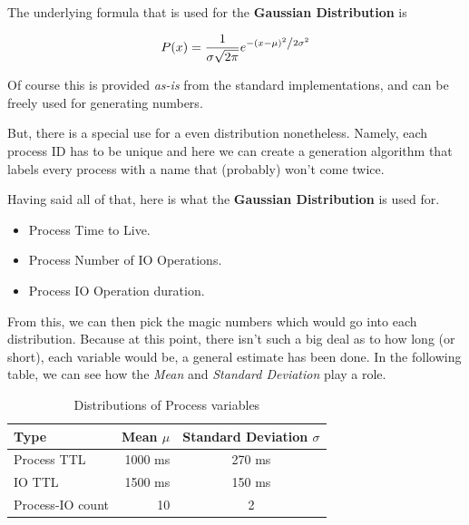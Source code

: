 \documentclass{article}
\newcommand{\code}[1]{\codeinline{\texttt{#1}}}
\begin{document}
The underlying formula that is used for the \textbf{Gaussian Distribution} is

\begin{equation}
P(x) = \frac{1}{{\sigma \sqrt {2\pi } }}e^{{{ - \left( {x - \mu } \right)^2 } \mathord{\left/ {\vphantom {{ - \left( {x - \mu } \right)^2 } {2\sigma ^2 }}} \right. \kern-\nulldelimiterspace} {2\sigma ^2 }}}
\end{equation}

Of course this is provided \textit{as-is} from the standard \code{C++} implementations, and can be freely used for generating numbers.

But, there is a special use for a even distribution nonetheless. Namely, each process ID has to be unique and here we can create a generation algorithm that labels every process with a name that (probably) won't come twice.

Having said all of that, here is what the \textbf{Gaussian Distribution} is used for.

\begin{itemize}
\item Process Time to Live.
\item Process Number of IO Operations.
\item Process IO Operation duration.
\end{itemize}

From this, we can then pick the magic numbers which would go into each distribution. Because at this point, there isn't such a big deal as to how long (or short), each variable would be, a general estimate has been done. In the following table, we can see how the \textit{Mean} and \textit{Standard Deviation} play a role.

\begin{table}[H]
  \begin{center}
    \label{tab:Distributions of Process variables}
    \begin{tabular}{l|r|c}
      \toprule
       \textbf{Type} & \textbf{Mean $\mu$} & \textbf{Standard Deviation $\sigma$} \\
      \midrule
      Process TTL & 1000 ms & 270 ms \\
      IO TTL & 1500 ms & 150 ms \\
      Process-IO count & 10 & 2 \\
      \bottomrule
    \end{tabular}
    \caption{Distributions of Process variables}
  \end{center}
\end{table}
\end{document}
